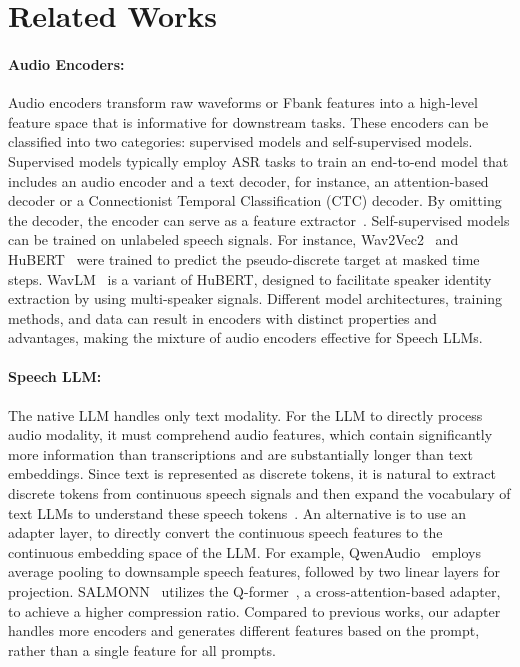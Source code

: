 \section{Related Works}

\paragraph{Audio Encoders:} Audio encoders transform raw waveforms or Fbank features into a high-level feature space that is informative for downstream tasks. These encoders can be classified into two categories: supervised models and self-supervised models. Supervised models typically employ ASR tasks to train an end-to-end model that includes an audio encoder and a text decoder, for instance, an attention-based decoder or a Connectionist Temporal Classification (CTC) decoder. By omitting the decoder, the encoder can serve as a feature extractor~\cite{radford2022robust, baevski2020wav2vec}. Self-supervised models can be trained on unlabeled speech signals. For instance, Wav2Vec2~\cite{baevski2020wav2vec} and HuBERT~\cite{hsu2021hubert} were trained to predict the pseudo-discrete target at masked time steps. WavLM~\cite{chen2021wavlm} is a variant of HuBERT, designed to facilitate speaker identity extraction by using multi-speaker signals. Different model architectures, training methods, and data can result in encoders with distinct properties and advantages, making the mixture of audio encoders effective for Speech LLMs.

\paragraph{Speech LLM:} The native LLM handles only text modality. For the LLM to directly process audio modality, it must comprehend audio features, which contain significantly more information than transcriptions and are substantially longer than text embeddings. Since text is represented as discrete tokens, it is natural to extract discrete tokens from continuous speech signals and then expand the vocabulary of text LLMs to understand these speech tokens~\cite{rubenstein2023audiopalm, veluri2024beyond, ma2024language}. An alternative is to use an adapter layer, to directly convert the continuous speech features to the continuous embedding space of the LLM. For example, QwenAudio~\cite{Qwen2-Audio} employs average pooling to downsample speech features, followed by two linear layers for projection. SALMONN~\cite{tang2024salmonn} utilizes the Q-former~\cite{yu2023connecting}, a cross-attention-based adapter, to achieve a higher compression ratio. Compared to previous works, our adapter handles more encoders and generates different features based on the prompt, rather than a single feature for all prompts.

